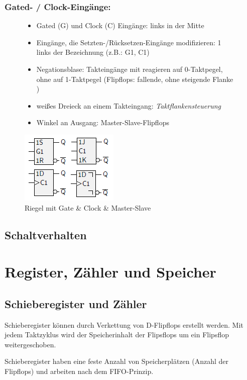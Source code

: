\documentclass[12pt]{report}
\begin{document}
\subsubsection{Gated- / Clock-Eingänge:}
\begin{figure}[H]
  \begin{minipage}[t]{0.45\textwidth}
    \begin{itemize}
      \item Gated (G) und Clock (C) Eingänge: links in der Mitte
      \item Eingänge, die Setzten-/Rücksetzen-Eingänge modifizieren: 1 links der Bezeichnung (z.B.: G1, C1)
      \item Negationsblase: Takteingänge mit reagieren auf 0-Taktpegel, ohne auf 1-Taktpegel (Flipflops: fallende, ohne steigende Flanke )
      \item weißes Dreieck an einem Takteingang: \textit{Taktflankensteuerung}
      \item Winkel an Ausgang: Master-Slave-Flipflops
    \end{itemize}
  \end{minipage}
  \hfill
  \begin{minipage}[t]{0.45\textwidth}
    \caption{Riegel mit Gate \& Clock \& Master-Slave}
    \centering
    \includegraphics{schaltzeichen_gate_clock_master-slave}
  \end{minipage}
\end{figure}

\subsection{Schaltverhalten}


\section{Register, Zähler und Speicher}
\subsection{Schieberegister und Zähler}
\begin{defbox}
  Schieberegister können durch Verkettung von D-Flipflops erstellt werden.
  Mit jedem Taktzyklus wird der Speicherinhalt der Flipsflops um ein Flipsflop weitergeschoben.
  
  Schieberegister haben eine feste Anzahl von Speicherplätzen (Anzahl der Flipflops) und arbeiten
  nach dem FIFO-Prinzip.
\end{defbox}
\end{document}
